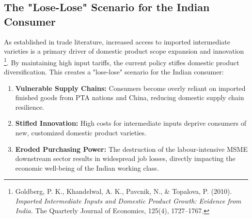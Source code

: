 \documentclass[11pt, a4paper]{article}
\numberwithin{figure}{section}
\numberwithin{table}{section}
\begin{document}
\subsection{The "Lose-Lose" Scenario for the Indian Consumer}
As established in trade literature, increased access to imported intermediate varieties is a primary driver of domestic product scope expansion and innovation \cite{goldberg2010}\footnote{Goldberg, P. K., Khandelwal, A. K., Pavcnik, N., \& Topalova, P. (2010). \textit{Imported Intermediate Inputs and Domestic Product Growth: Evidence from India.} The Quarterly Journal of Economics, 125(4), 1727--1767.}. By maintaining high input tariffs, the current policy stifles domestic product diversification. This creates a "lose-lose" scenario for the Indian consumer:
\begin{enumerate}
    \item \textbf{Vulnerable Supply Chains:} Consumers become overly reliant on imported finished goods from PTA nations and China, reducing domestic supply chain resilience.
    \item \textbf{Stifled Innovation:} High costs for intermediate inputs deprive consumers of new, customized domestic product varieties.
    \item \textbf{Eroded Purchasing Power:} The destruction of the labour-intensive MSME downstream sector results in widespread job losses, directly impacting the economic well-being of the Indian working class.
\end{enumerate}

\end{document}
